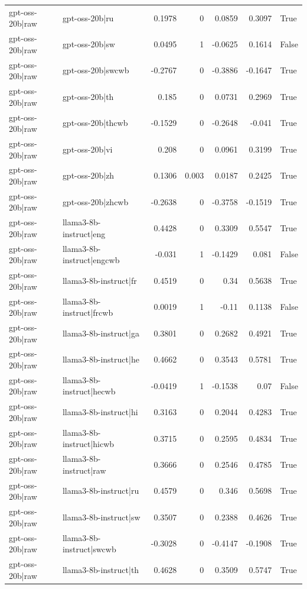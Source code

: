 \begin{table}
\begin{tabular}{l l r r r r l}
gpt-oss-20b|raw & gpt-oss-20b|ru & 0.1978 & 0 & 0.0859 & 0.3097 & True \\
gpt-oss-20b|raw & gpt-oss-20b|sw & 0.0495 & 1 & -0.0625 & 0.1614 & False \\
gpt-oss-20b|raw & gpt-oss-20b|swcwb & -0.2767 & 0 & -0.3886 & -0.1647 & True \\
gpt-oss-20b|raw & gpt-oss-20b|th & 0.185 & 0 & 0.0731 & 0.2969 & True \\
gpt-oss-20b|raw & gpt-oss-20b|thcwb & -0.1529 & 0 & -0.2648 & -0.041 & True \\
gpt-oss-20b|raw & gpt-oss-20b|vi & 0.208 & 0 & 0.0961 & 0.3199 & True \\
gpt-oss-20b|raw & gpt-oss-20b|zh & 0.1306 & 0.003 & 0.0187 & 0.2425 & True \\
gpt-oss-20b|raw & gpt-oss-20b|zhcwb & -0.2638 & 0 & -0.3758 & -0.1519 & True \\
gpt-oss-20b|raw & llama3-8b-instruct|eng & 0.4428 & 0 & 0.3309 & 0.5547 & True \\
gpt-oss-20b|raw & llama3-8b-instruct|engcwb & -0.031 & 1 & -0.1429 & 0.081 & False \\
gpt-oss-20b|raw & llama3-8b-instruct|fr & 0.4519 & 0 & 0.34 & 0.5638 & True \\
gpt-oss-20b|raw & llama3-8b-instruct|frcwb & 0.0019 & 1 & -0.11 & 0.1138 & False \\
gpt-oss-20b|raw & llama3-8b-instruct|ga & 0.3801 & 0 & 0.2682 & 0.4921 & True \\
gpt-oss-20b|raw & llama3-8b-instruct|he & 0.4662 & 0 & 0.3543 & 0.5781 & True \\
gpt-oss-20b|raw & llama3-8b-instruct|hecwb & -0.0419 & 1 & -0.1538 & 0.07 & False \\
gpt-oss-20b|raw & llama3-8b-instruct|hi & 0.3163 & 0 & 0.2044 & 0.4283 & True \\
gpt-oss-20b|raw & llama3-8b-instruct|hicwb & 0.3715 & 0 & 0.2595 & 0.4834 & True \\
gpt-oss-20b|raw & llama3-8b-instruct|raw & 0.3666 & 0 & 0.2546 & 0.4785 & True \\
gpt-oss-20b|raw & llama3-8b-instruct|ru & 0.4579 & 0 & 0.346 & 0.5698 & True \\
gpt-oss-20b|raw & llama3-8b-instruct|sw & 0.3507 & 0 & 0.2388 & 0.4626 & True \\
gpt-oss-20b|raw & llama3-8b-instruct|swcwb & -0.3028 & 0 & -0.4147 & -0.1908 & True \\
gpt-oss-20b|raw & llama3-8b-instruct|th & 0.4628 & 0 & 0.3509 & 0.5747 & True \\

\end{tabular}
\end{table}
